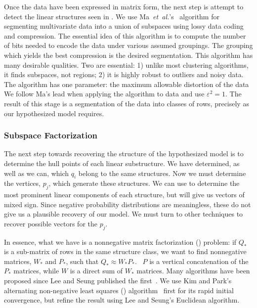 \documentclass[conference]{IEEEtran}
\begin{document}
Once the data have been expressed in matrix form, the next step is attempt to detect the linear structures seen in .
We use Ma~\emph{et~al.}'s~\cite{Ma07} algorithm for segmenting multivariate data into a union of subspaces using lossy data coding and compression.
The essential idea of this algorithm is to compute the number of bits needed to encode the data under various assumed groupings.
The grouping which yields the best compression is the desired segmentation.
This algorithm has many desirable qualities.
Two are essential:
1) unlike most clustering algorithms, it finds subspaces, not regions;
2) it is highly robust to outliers and noisy data.
The algorithm has one parameter:
the maximum allowable distortion of the data
We follow Ma's lead when applying the algorithm to  data and use $\varepsilon^2 = 1$.
The result of this stage is a segmentation of the data into classes of rows, precisely as our hypothesized model requires.

\subsubsection{Subspace Factorization}


The next step towards recovering the structure of the hypothesized model is to determine the hull points of each linear substructure.
We have determined, as well as we can, which $q_i$ belong to the same structures.
Now we must determine the vertices, $p_j$, which generate these structures.
We can use  to determine the most prominent linear components of each structure, but  will give us vectors of mixed sign.\svdnnnote
Since negative probability distributions are meaningless, these do not give us a plausible recovery of our model.
We must turn to other techniques to recover possible vectors for the $p_j$.

In essence, what we have is a nonnegative matrix factorization () problem:
if $Q_*$ is a sub-matrix of rows in the same structure class, we want to find nonnegative matrices, $W_*$ and $P_*$, such that $Q_* \approx W_* P_*$.~
$P$ is a vertical concatenation of the $P_*$ matrices, while $W$ is a direct sum of $W_*$ matrices.
Many  algorithms have been proposed since Lee and Seung published the first~\cite{Lee01}.
We use Kim and Park's alternating non-negative least squares () algorithm~\cite{Kim08:anls} first for its rapid initial convergence, but refine the result using Lee and Seung's Euclidean algorithm.
\end{document}
